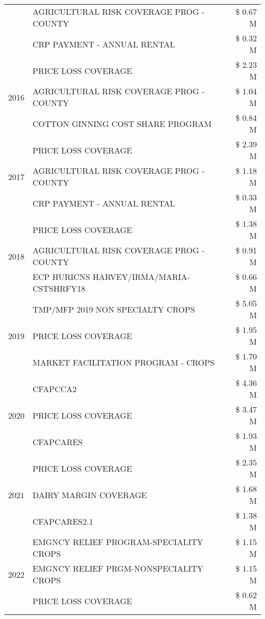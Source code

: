 \begin{tabular}{llr}
 & AGRICULTURAL RISK COVERAGE PROG - COUNTY & \$ 0.67 M \\
 & CRP PAYMENT - ANNUAL RENTAL & \$ 0.32 M \\
\cline{1-3}
\multirow[t]{3}{*}{2016} & PRICE LOSS COVERAGE & \$ 2.23 M \\
 & AGRICULTURAL RISK COVERAGE PROG - COUNTY & \$ 1.04 M \\
 & COTTON GINNING COST SHARE PROGRAM & \$ 0.84 M \\
\cline{1-3}
\multirow[t]{3}{*}{2017} & PRICE LOSS COVERAGE & \$ 2.39 M \\
 & AGRICULTURAL RISK COVERAGE PROG - COUNTY & \$ 1.18 M \\
 & CRP PAYMENT - ANNUAL RENTAL & \$ 0.33 M \\
\cline{1-3}
\multirow[t]{3}{*}{2018} & PRICE LOSS COVERAGE & \$ 1.38 M \\
 & AGRICULTURAL RISK COVERAGE PROG - COUNTY & \$ 0.91 M \\
 & ECP HURICNS HARVEY/IRMA/MARIA-CSTSHRFY18 & \$ 0.66 M \\
\cline{1-3}
\multirow[t]{3}{*}{2019} & TMP/MFP 2019 NON SPECIALTY CROPS & \$ 5.05 M \\
 & PRICE LOSS COVERAGE & \$ 1.95 M \\
 & MARKET FACILITATION PROGRAM - CROPS & \$ 1.70 M \\
\cline{1-3}
\multirow[t]{3}{*}{2020} & CFAPCCA2 & \$ 4.36 M \\
 & PRICE LOSS COVERAGE & \$ 3.47 M \\
 & CFAPCARES & \$ 1.93 M \\
\cline{1-3}
\multirow[t]{3}{*}{2021} & PRICE LOSS COVERAGE & \$ 2.35 M \\
 & DAIRY MARGIN COVERAGE & \$ 1.68 M \\
 & CFAPCARES2.1 & \$ 1.38 M \\
\cline{1-3}
\multirow[t]{3}{*}{2022} & EMGNCY RELIEF PROGRAM-SPECIALITY CROPS & \$ 1.15 M \\
 & EMGNCY RELIEF PRGM-NONSPECIALITY CROPS & \$ 1.15 M \\
 & PRICE LOSS COVERAGE & \$ 0.62 M \\
\cline{1-3}
\bottomrule
\end{tabular}
